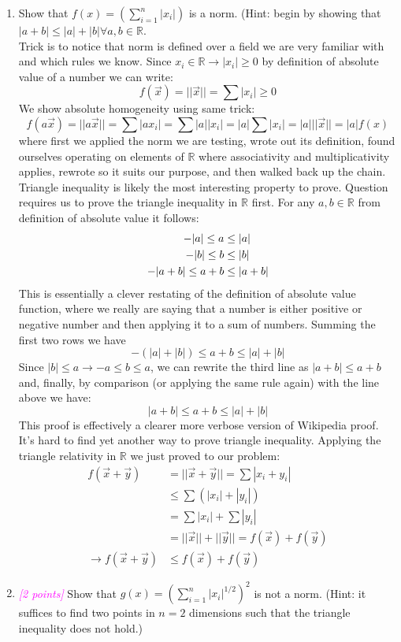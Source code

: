 \documentclass{article}
\newcommand{\field}[1]{\mathbb{#1}}
\newcommand{\1}{\mathbf{1}}
\newcommand{\R}{\field{R}} %
\newcommand{\points}[1]{\small\textcolor{magenta}{\emph{[#1 points]}} \normalsize}
\begin{document}
\begin{enumerate}
\item Show that $f(x) = (\sum^n_{i=1}|x_i|)$ is a norm. (Hint: begin by showing that $|a+b| \leq |a|+|b| \forall a,b \in \R$. \\
Trick is to notice that norm is defined over a field we are very familiar with and which rules we know. Since $x_i\in\R \rightarrow |x_i|\geq 0$ by definition of absolute value of a number we can write:
$$f(\vec x) = ||\vec x|| = \sum |x_i| \geq 0$$
We show absolute homogeneity using same trick:
$$f(a\vec x)= ||a\vec x|| = \sum |ax_i| = \sum |a||x_i| = |a|\sum|x_i| = |a|||\vec x|| = |a|f(x)$$
where first we applied the norm we are testing, wrote out its definition, found ourselves operating on elements of $\R$ where associativity and multiplicativity applies, rewrote so it suits our purpose, and then walked back up the chain. Triangle inequality is likely the most interesting property to prove. Question requires us to prove the triangle inequality in $\R$ first. For any $a,b\in\R$ from definition of absolute value it follows:
\begin{align*}
\centering
    -|a|\leq a &\leq |a| \\
    -|b|\leq b &\leq |b| \\
    -|a+b|\leq a+b &\leq |a+b|
\end{align*}
This is essentially a clever restating of the definition of absolute value function, where we really are saying that a number is either positive or negative number and then applying it to a sum of numbers. Summing the first two rows we have 
$$-(|a|+|b|)\leq a + b \leq |a| + |b| $$
Since $|b|\leq a \rightarrow -a \leq b \leq a$, we can rewrite the third line as $|a+b|\leq a+b$ and, finally, by comparison (or applying the same rule again) with the line above we have:
$$|a+b|\leq a+b \leq |a| + |b|$$
This proof is effectively a clearer more verbose version of Wikipedia proof. It's hard to find yet another way to prove triangle inequality. Applying the triangle relativity in $\R$ we just proved to our problem:
\begin{align*}
    f(\vec x + \vec y) &= ||\vec x + \vec y|| = \sum |x_i + y_i| \\
    & \leq \sum \left( |x_i| + |y_i|\right) \\
    &= \sum |x_i| + \sum |y_i| \\
    & = ||\vec x|| + ||\vec y|| = f(\vec x) + f(\vec y) \\
    \rightarrow f(\vec x + \vec y) &\leq f(\vec x) + f(\vec y) 
\end{align*}{}

\newpage
\item \points{2} Show that $g(x) =(\sum^n_{i=1}|x_i|^{1/2})^2$ is not a norm. (Hint: it suffices to find two points in $n= 2$ dimensions such that the triangle inequality does not hold.)
\end{enumerate}
\end{document}
